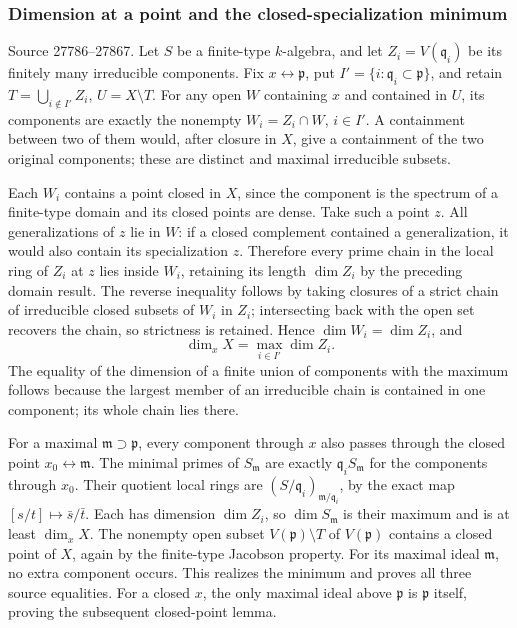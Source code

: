 \subsubsection{Dimension at a point and the closed-specialization minimum}\label{dimension-at-a-point-and-the-closed-specialization-minimum}

Source 27786--27867. Let \(S\) be a finite-type \(k\)-algebra, and let \(Z_i=V(\mathfrak q_i)\) be its finitely many irreducible components. Fix \(x\leftrightarrow\mathfrak p\), put \(I'=\{i:\mathfrak q_i\subset
\mathfrak p\}\), and retain \(T=\bigcup_{i\notin I'}Z_i\), \(U=X\setminus T\). For any open \(W\) containing \(x\) and contained in \(U\), its components are exactly the nonempty \(W_i=Z_i\cap W\), \(i\in I'\). A containment between two of them would, after closure in \(X\), give a containment of the two original components; these are distinct and maximal irreducible subsets.

Each \(W_i\) contains a point closed in \(X\), since the component is the spectrum of a finite-type domain and its closed points are dense. Take such a point \(z\). All generalizations of \(z\) lie in \(W\): if a closed complement contained a generalization, it would also contain its specialization \(z\). Therefore every prime chain in the local ring of \(Z_i\) at \(z\) lies inside \(W_i\), retaining its length \(\dim Z_i\) by the preceding domain result. The reverse inequality follows by taking closures of a strict chain of irreducible closed subsets of \(W_i\) in \(Z_i\); intersecting back with the open set recovers the chain, so strictness is retained. Hence \(\dim W_i=\dim Z_i\), and \[
 \dim_x X=\max_{i\in I'}\dim Z_i.
\] The equality of the dimension of a finite union of components with the maximum follows because the largest member of an irreducible chain is contained in one component; its whole chain lies there.

For a maximal \(\mathfrak m\supset\mathfrak p\), every component through \(x\) also passes through the closed point \(x_0\leftrightarrow\mathfrak m\). The minimal primes of \(S_{\mathfrak m}\) are exactly \(\mathfrak q_i S_{\mathfrak m}\) for the components through \(x_0\). Their quotient local rings are \((S/\mathfrak q_i)_{\mathfrak m/\mathfrak q_i}\), by the exact map \([s/t]\mapsto\bar s/\bar t\). Each has dimension \(\dim Z_i\), so \(\dim S_{\mathfrak m}\) is their maximum and is at least \(\dim_xX\). The nonempty open subset \(V(\mathfrak p)\setminus T\) of \(V(\mathfrak p)\) contains a closed point of \(X\), again by the finite-type Jacobson property. For its maximal ideal \(\mathfrak m\), no extra component occurs. This realizes the minimum and proves all three source equalities. For a closed \(x\), the only maximal ideal above \(\mathfrak p\) is \(\mathfrak p\) itself, proving the subsequent closed-point lemma.

